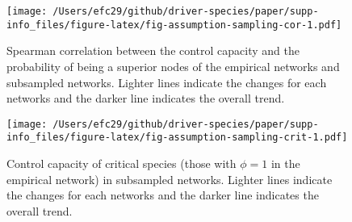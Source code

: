 \documentclass[a4paper]{artikel1}
\theoremstyle{definition}
\theoremstyle{definition}
\theoremstyle{definition}
\theoremstyle{remark}
\begin{document}
\begin{figure}
\centering
\texttt{[image: /Users/efc29/github/driver-species/paper/supp-info\_files/figure-latex/fig-assumption-sampling-cor-1.pdf]}
\caption{\label{fig:fig-assumption-sampling-cor}Spearman correlation between
the control capacity and the probability of being a superior nodes of
the empirical networks and subsampled networks. Lighter lines indicate
the changes for each networks and the darker line indicates the overall
trend.}
\end{figure}

\begin{figure}
\centering
\texttt{[image: /Users/efc29/github/driver-species/paper/supp-info\_files/figure-latex/fig-assumption-sampling-crit-1.pdf]}
\caption{\label{fig:fig-assumption-sampling-crit}Control capacity of
critical species (those with \(\phi = 1\) in the empirical network) in
subsampled networks. Lighter lines indicate the changes for each
networks and the darker line indicates the overall trend.}
\end{figure}

\clearpage
\end{document}
